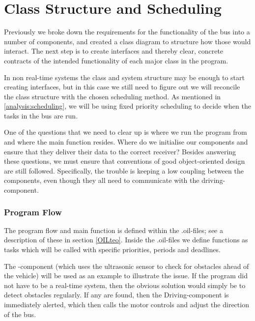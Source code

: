\section{Class Structure and Scheduling}

Previously we broke down the requirements for the functionality of the bus into a number of components, and created a class diagram  to structure how those would interact. The next step is to create interfaces and thereby clear, concrete contracts of the intended functionality of each major class in the program. 

In non real-time systems the class and system structure may be enough to start creating interfaces, but in this case we still need to figure out we will reconcile the class structure with the chosen scheduling method. As mentioned in \ref{analysis:scheduling}, we will be using fixed priority scheduling to decide when the tasks in the bus are run. 

One of the questions that we need to clear up is where we run the program from and where the main function resides. Where do we initialise our components and ensure that they deliver their data to the correct receiver? Besides answering these questions, we must ensure that conventions of good object-oriented design are still followed. Specifically, the trouble is keeping a low coupling between the components, even though they all need to communicate with the driving-component. 

\subsubsection{Program Flow}
The program flow and main function is defined within the .oil-files; see a description of these in section \ref{OILteo}. Inside the .oil-files we define functions as tasks which will be called with specific priorities, periods and deadlines. 

The -component (which uses the ultrasonic sensor to check for obstacles ahead of the vehicle) will be used as an example to illustrate the issue. If the program did not have to be a real-time system, then the obvious solution would simply be to detect obstacles regularly. If any are found, then the Driving-component is immediately alerted, which then calls the motor controls and adjust the direction of the bus.

